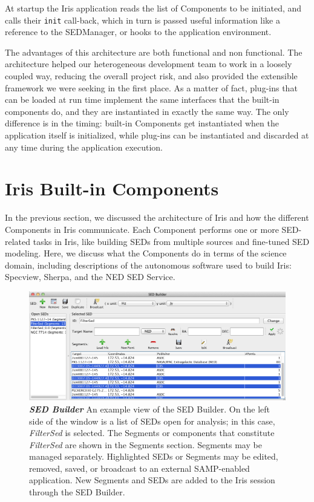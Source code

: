\documentclass[final,5p,authoryear]{elsarticle}
\begin{document}
At startup the Iris application reads the list of Components to be initiated,
and calls their \texttt{init} call-back, which in turn is passed useful information
like a reference to the SEDManager, or hooks to the application environment.

The advantages of this architecture are both functional and non functional. The architecture
helped our heterogeneous development team to work in a loosely coupled way,
reducing the overall project risk, and also provided the extensible framework
we were seeking in the first place. As a matter of fact, plug-ins that can be
loaded at run time implement the same interfaces that the built-in components
do, and they are instantiated in exactly the same way. The only difference is in
the timing: built-in Components get instantiated when the application itself is
initialized, while plug-ins can be instantiated and discarded at any time during
the application execution.

\section{Iris Built-in Components} \label{sec:components} In the previous
section, we discussed the architecture of Iris and how the different Components
in Iris communicate. Each Component performs one or more SED-related tasks in
Iris, like building SEDs from multiple sources and fine-tuned SED modeling.
Here, we discuss what the Components do in terms of the science domain, including
descriptions of the autonomous software used to build
Iris: Specview, Sherpa, and the NED SED Service.

\begin{figure} \begin{center}
\includegraphics[width=\textwidth]{figures/sed_builder.png}
\caption{\textit{\textbf{SED Builder}} An example view of the SED Builder. On
the left side of the window is a list of SEDs open for analysis; in this case,
\textit{FilterSed} is selected. The Segments or components that constitute
\textit{FilterSed} are shown in the Segments section. Segments may be managed
separately. Highlighted SEDs or Segments may be edited, removed, saved, or
broadcast to an external SAMP-enabled application. New Segments and SEDs are
added to the Iris session through the SED Builder. } \label{fig:sed_builder}
\end{center} \end{figure}
\end{document}

